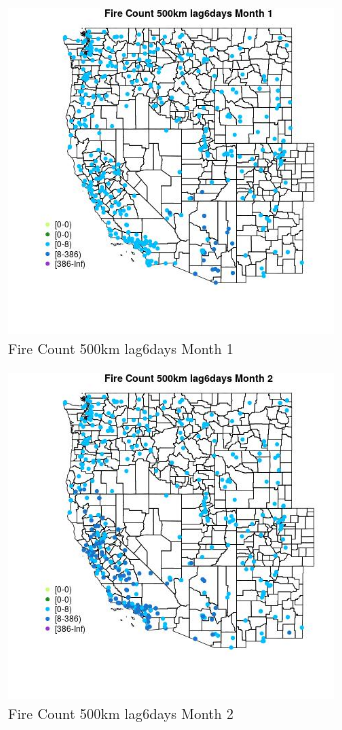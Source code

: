 \begin{figure} 
\centering  
\includegraphics[width=0.77\textwidth]{Code_Outputs/Report_ML_input_PM25_Step4_part_e_de_duplicated_aves_compiled_2019-05-18wNAs_MapObsMo1Fire_Count_500km_lag6days.jpg} 
\caption{\label{fig:Report_ML_input_PM25_Step4_part_e_de_duplicated_aves_compiled_2019-05-18wNAsMapObsMo1Fire_Count_500km_lag6days}Fire Count 500km lag6days Month 1} 
\end{figure} 
 

\begin{figure} 
\centering  
\includegraphics[width=0.77\textwidth]{Code_Outputs/Report_ML_input_PM25_Step4_part_e_de_duplicated_aves_compiled_2019-05-18wNAs_MapObsMo2Fire_Count_500km_lag6days.jpg} 
\caption{\label{fig:Report_ML_input_PM25_Step4_part_e_de_duplicated_aves_compiled_2019-05-18wNAsMapObsMo2Fire_Count_500km_lag6days}Fire Count 500km lag6days Month 2} 
\end{figure} 
 

